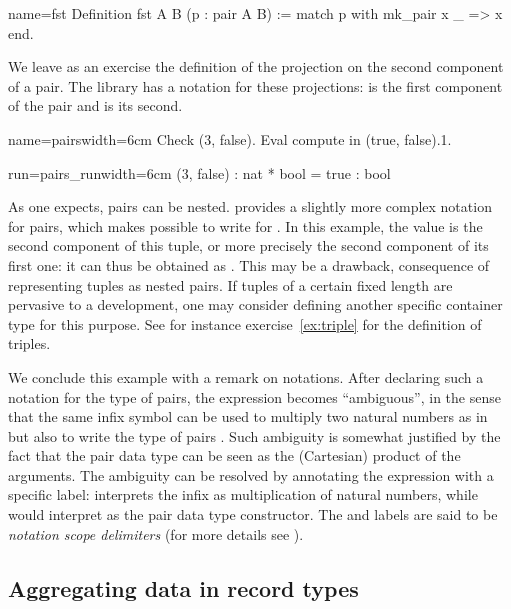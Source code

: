 \begin{coq}{name=fst}{}
Definition fst A B (p : pair A B) :=
  match p with mk_pair x _ => x end.
\end{coq}

We leave as an exercise the definition of the projection on the second
component of a pair. The \mcbMC{} library has a notation for these
projections:  is the first component of the pair 
and  is its second.

\begin{coq}{name=pairs}{width=6cm}
Check (3, false).
Eval compute in (true, false).1.
\end{coq}
\begin{coqout}{run=pairs_run}{width=6cm}
(3, false) : nat * bool
 = true : bool
\end{coqout}
As one expects, pairs can be nested. \Coq{} provides a slightly more complex
notation for pairs, which makes possible to write  for
. In this example, the value  is the second
component of this tuple, or more precisely the second component of its
first one: it can thus be obtained as . This may be
a drawback, consequence of representing tuples as nested pairs. If
tuples of a certain fixed length are pervasive to a development, one
may consider defining another specific container type for this
purpose. See for instance exercise~\ref{ex:triple} for the definition
of triples.

We conclude this example with a remark on notations. After declaring
such a notation for the type of pairs, the expression 
becomes ``ambiguous'',
in the sense that the same infix \C{*} symbol can be used to multiply two
natural numbers as in  but also to write the type of pairs .  Such ambiguity is somewhat justified by the fact that the pair
data type can be seen as the (Cartesian) product of the arguments.  The
ambiguity can be resolved by annotating the expression with a specific
label:  interprets the infix \C{*} as multiplication of natural numbers,
while  would interpret \C{*} as the pair data type
constructor. The  and  labels are said to be
\emph{notation scope delimiters} (for more details see
\cite[section 12.2]{Coq:manual}).

\subsection{Aggregating data in record types}
\label{sec:records}

